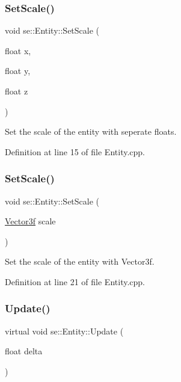 \subsubsection{\texorpdfstring{Set\+Scale()}{SetScale()}\hspace{0.1cm}{\footnotesize\ttfamily [1/2]}}
{\footnotesize\ttfamily void se\+::\+Entity\+::\+Set\+Scale (\begin{DoxyParamCaption}\item[{float}]{x,  }\item[{float}]{y,  }\item[{float}]{z }\end{DoxyParamCaption})\hspace{0.3cm}{\ttfamily [virtual]}}

Set the scale of the entity with seperate floats. 

Definition at line 15 of file Entity.\+cpp.

\mbox{\label{classse_1_1_entity_a70df7cdf2d72ff4d767033c2994b673f}} 
\subsubsection{\texorpdfstring{Set\+Scale()}{SetScale()}\hspace{0.1cm}{\footnotesize\ttfamily [2/2]}}
{\footnotesize\ttfamily void se\+::\+Entity\+::\+Set\+Scale (\begin{DoxyParamCaption}\item[{\mbox{\hyperlink{namespacese_a12e07512d95e2fdebdaf74a5ea2cf5f6}{Vector3f}}}]{scale }\end{DoxyParamCaption})\hspace{0.3cm}{\ttfamily [virtual]}}

Set the scale of the entity with Vector3f. 

Definition at line 21 of file Entity.\+cpp.

\mbox{\label{classse_1_1_entity_a1542c96865f6646c7b0cb0d9be7f88ad}} 
\subsubsection{\texorpdfstring{Update()}{Update()}}
{\footnotesize\ttfamily virtual void se\+::\+Entity\+::\+Update (\begin{DoxyParamCaption}\item[{float}]{delta }\end{DoxyParamCaption})\hspace{0.3cm}{\ttfamily [pure virtual]}}

